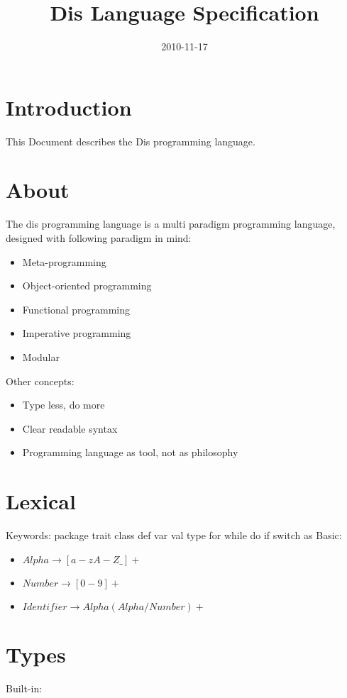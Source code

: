 \documentclass[9pt,a4paper]{article}
\title{Dis Language Specification}
\date{2010-11-17}
\author{}
\begin{document}
\maketitle
\newpage
\tableofcontents
\newpage

\section{Introduction}
This Document describes the Dis programming language.

\section{About}
The dis programming language is a multi paradigm programming language, designed with following paradigm in mind:
\begin{itemize}
\item Meta-programming
\item Object-oriented programming
\item Functional programming
\item Imperative programming
\item Modular
\end{itemize}

Other concepts:
\begin{itemize}
\item Type less, do more
\item Clear readable syntax
\item Programming language as tool, not as philosophy
\end{itemize}

\section{Lexical}
Keywords:
package trait class def var val type for while do if switch as
Basic:

\begin{itemize}
\item $Alpha \rightarrow [a-zA-Z\_]+$
\item $Number \rightarrow [0-9]+$
\item $Identifier \rightarrow Alpha (Alpha / Number)+$
\end{itemize}

\section{Types}
Built-in:
\end{document}
